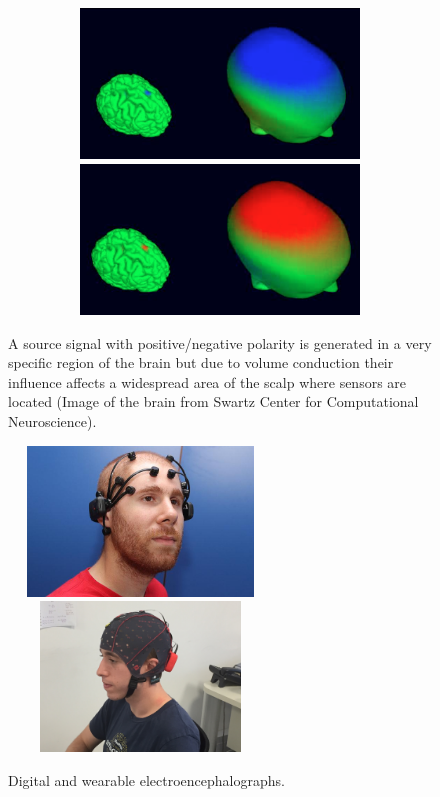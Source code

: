 \documentclass[aspectratio=169]{beamer}
\begin{document}
\begin{frame}    
\begin{figure}[]
\centering
\includegraphics[height=4cm,width=1\textwidth]{images/volconduction1.png}\\
\includegraphics[height=4cm,width=1\textwidth]{images/volconduction2.png}
\caption[EEG Volume Conduction]{A source signal with positive/negative polarity is generated in a very specific region of the brain but due to volume conduction their influence affects a widespread area of the scalp where sensors are located (Image of the brain from Swartz Center for Computational Neuroscience).}
\label{fig:volconduction}
\end{figure}
\end{frame}

\begin{frame}   
\begin{figure}[]
\centering
\includegraphics[height=4cm,width=7cm]{images/emotivsubject.jpg}
\includegraphics[height=4cm,width=7cm]{images/gTecsubject.jpg}
\caption[Wearable portable Digital Electroencephalograph]{Digital and wearable electroencephalographs.}
\label{fig:digitalelectroencephalograph}
\end{figure}
\end{frame}
\end{document}
